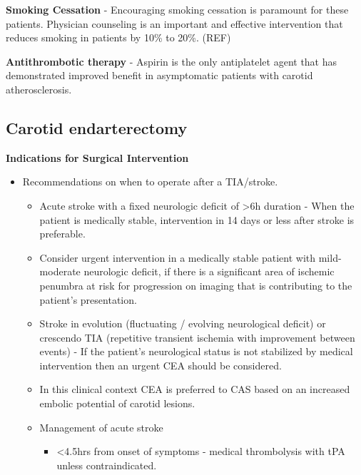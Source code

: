 \documentclass[
]{book}
\begin{document}
\textbf{Smoking Cessation} - Encouraging smoking cessation is paramount for
these patients. Physician counseling is an important and effective
intervention that reduces smoking in patients by 10\% to 20\%. (REF)

\textbf{Antithrombotic therapy} - Aspirin is the only antiplatelet agent that
has demonstrated improved benefit in asymptomatic patients with carotid
atherosclerosis.

\hypertarget{carotid-endarterectomy}{%
\subsection{Carotid endarterectomy}\label{carotid-endarterectomy}}

\textbf{Indications for Surgical Intervention}

\begin{itemize}
\item
  Recommendations on when to operate after a TIA/stroke.

  \begin{itemize}
  \item
    Acute stroke with a fixed neurologic deficit of \textgreater6h duration -
    When the patient is medically stable, intervention in 14 days or
    less after stroke is preferable.
    \citep{rothwellEndarterectomySymptomaticCarotid2004, meershoekTimingCarotidIntervention2018}
  \item
    Consider urgent intervention in a medically stable patient with
    mild-moderate neurologic deficit, if there is a significant area
    of ischemic penumbra at risk for progression on imaging that is
    contributing to the patient's presentation.
  \item
    Stroke in evolution (fluctuating / evolving neurological
    deficit) or crescendo TIA (repetitive transient ischemia with
    improvement between events) - If the patient's neurological
    status is not stabilized by medical intervention then an urgent
    CEA should be considered.
  \item
    In this clinical context CEA is preferred to CAS based on an
    increased embolic potential of carotid lesions.
    \citep{rantnerEarlyEndarterectomyCarries2017}
  \item
    Management of acute stroke \citep{powers2018GuidelinesEarly2018}

    \begin{itemize}
    \item
      \textless4.5hrs from onset of symptoms - medical thrombolysis with
      tPA unless contraindicated.


\end{itemize}
\end{itemize}
\end{itemize}
\end{document}
